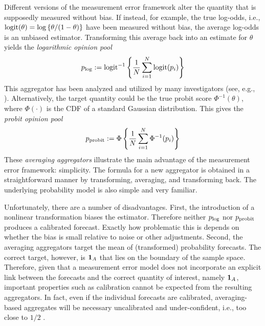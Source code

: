 \documentclass[12pt]{article}
\theoremstyle{definition}
\theoremstyle{definition}
\def\one{{\bf 1}}
\def\probit{p_{\rm probit}}
\def\logit{{\rm logit}}
\def\plog{p_{\rm log}}
\begin{document}
Different versions of the measurement error framework alter the quantity that is supposedly
measured without bias. If instead, for example, the true log-odds, i.e., 
$\logit(\theta) = \log\left\{\theta/(1-\theta)\right\}$ have been measured without
bias, the average log-odds is an unbiased estimator. Transforming
this average back into an estimate for $\theta$ yields the {\em
logarithmic opinion pool}
$$\plog := \logit^{-1} \left\{ \frac{1}{N} \sum_{i=1}^N \logit
   (p_i) \right \} $$
 This aggregator has been analyzed and utilized by many
investigators (see, e.g., \citealt{bacharach1975group,Genest,dawid1995coherent}). Alternatively, the target quantity could be
the true probit score $\Phi^{-1}(\theta)$, where $\Phi(\cdot)$ is the CDF of a standard Gaussian
distribution. This gives the {\em probit opinion pool}
$$\probit := \Phi \left\{ \frac{1}{N} \sum_{i=1}^N \Phi^{-1}
   (p_i) \right \} $$
These \textit{averaging aggregators} illustrate the main advantage of the measurement
error framework: simplicity.  The formula for a new aggregator is
obtained in a straightforward manner by transforming, averaging, and
transforming back.  The underlying probability model is also simple
and very familiar.  

Unfortunately, there are a number of disadvantages. First, the introduction of a nonlinear transformation biases the
estimator.  Therefore neither $\plog$ nor $\probit$ produces a
calibrated forecast. Exactly how problematic this is depends on
whether the bias is small relative to noise or other
adjustments. Second, the averaging aggregators target the mean of
(transformed) probability forecasts. The correct target,
however, is $\one_A$ that lies on the boundary of
the sample space. Therefore, given that a measurement error model does not incorporate an explicit link between the forecasts and the correct quantity of interest, namely $\one_A$, important properties such as calibration cannot be expected from the resulting aggregators. In fact, even if the individual forecasts are calibrated, averaging-based aggregates will be necessary uncalibrated and under-confident, i.e., too close to $1/2$ \citep{Ranjan08}.
\end{document}
